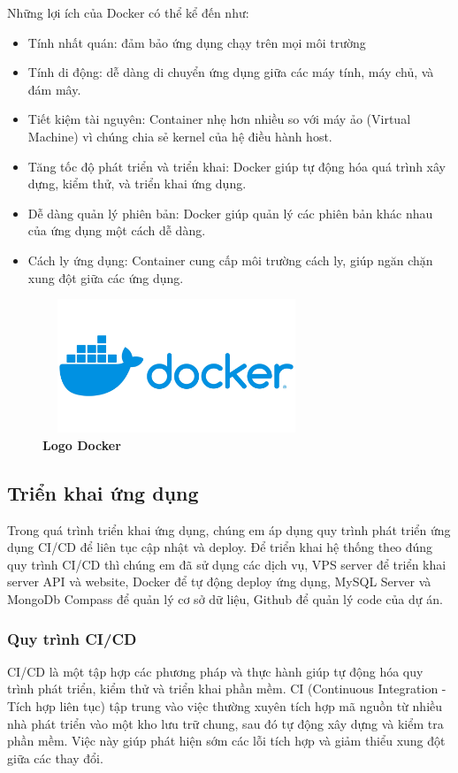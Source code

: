 Những lợi ích của Docker có thể kể đến như: 
\begin{itemize}
  \item Tính nhất quán: đảm bảo ứng dụng chạy trên mọi môi trường
  \item Tính di động: dễ dàng di chuyển ứng dụng giữa các máy tính, máy chủ, và đám mây.
  \item Tiết kiệm tài nguyên: Container nhẹ hơn nhiều so với máy ảo (Virtual Machine) vì chúng chia sẻ kernel của hệ điều hành host.
  \item Tăng tốc độ phát triển và triển khai: Docker giúp tự động hóa quá trình xây dựng, kiểm thử, và triển khai ứng dụng.
  \item Dễ dàng quản lý phiên bản: Docker giúp quản lý các phiên bản khác nhau của ứng dụng một cách dễ dàng.
  \item Cách ly ứng dụng: Container cung cấp môi trường cách ly, giúp ngăn chặn xung đột giữa các ứng dụng.
\end{itemize}

\begin{figure}[H]
  \centering
  \includegraphics[width=8cm,height=4cm]{Images/Technology/docker.jpg}
  \caption[Logo Docker]{\bfseries \fontsize{12pt}{0pt}
  \selectfont Logo Docker}
  \label{docker} %
\end{figure}


\subsection{Triển khai ứng dụng}
Trong quá trình triển khai ứng dụng, chúng em áp dụng quy trình phát triển ứng dụng CI/CD để liên tục cập nhật và deploy. Để triển khai hệ thống theo đúng quy trình CI/CD thì chúng em đã sử dụng các dịch vụ, VPS server để triển khai server API và website, Docker để tự động deploy ứng dụng, MySQL Server và MongoDb Compass để quản lý cơ sở dữ liệu, Github để quản lý code của dự án.

\subsubsection{Quy trình CI/CD}
CI/CD là một tập hợp các phương pháp và thực hành giúp tự động hóa quy trình phát triển, kiểm thử và triển khai phần mềm. CI (Continuous Integration - Tích hợp liên tục) tập trung vào việc thường xuyên tích hợp mã nguồn từ nhiều nhà phát triển vào một kho lưu trữ chung, sau đó tự động xây dựng và kiểm tra phần mềm. Việc này giúp phát hiện sớm các lỗi tích hợp và giảm thiểu xung đột giữa các thay đổi.

